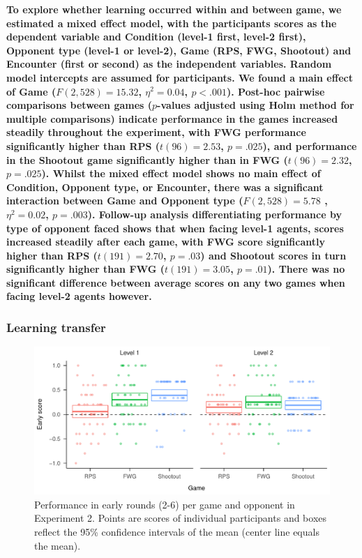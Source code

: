 \documentclass[english,man,floatsintext]{apa6}
\begin{document}
\textbf{To explore whether learning occurred within and between game, we estimated a mixed effect model, with the participants scores as the dependent variable and Condition (level-1 first, level-2 first), Opponent type (level-1 or level-2), Game (RPS, FWG, Shootout) and Encounter (first or second) as the independent variables. Random model intercepts are assumed for participants. We found a main effect of Game (\(F(2,528) = 15.32\), \(\eta^{2} = 0.04\), \(p < .001\)). Post-hoc pairwise comparisons between games (\(p\)-values adjusted using Holm method for multiple comparisons) indicate performance in the games increased steadily throughout the experiment, with FWG performance significantly higher than RPS (\(t(96) =2.53\), \(p = .025\)), and performance in the Shootout game significantly higher than in FWG (\(t(96) = 2.32\), \(p = .025\)). Whilst the mixed effect model shows no main effect of Condition, Opponent type, or Encounter, there was a significant interaction between Game and Opponent type (\(F(2, 528) = 5.78\) ,\(\eta^{2} = 0.02\), \(p = .003\)). Follow-up analysis differentiating performance by type of opponent faced shows that when facing level-1 agents, scores increased steadily after each game, with FWG score significantly higher than RPS (\(t(191) = 2.70\), \(p = .03\)) and Shootout scores in turn significantly higher than FWG (\(t(191) = 3.05\), \(p = .01\)). There was no significant difference between average scores on any two games when facing level-2 agents however.}

\hypertarget{learning-transfer-1}{%
\subsubsection{Learning transfer}\label{learning-transfer-1}}

\begin{figure}

{\centering \includegraphics{paper_draft_2021_files/figure-latex/exp2-early-score-by-opp-1} 

}

\caption{\label{ref:figure4-caption}Performance in early rounds (2-6) per game and opponent in Experiment 2. Points are scores of individual participants and boxes reflect the 95\% confidence intervals of the mean (center line equals the mean).}\label{fig:exp2-early-score-by-opp}
\end{figure}
\end{document}
